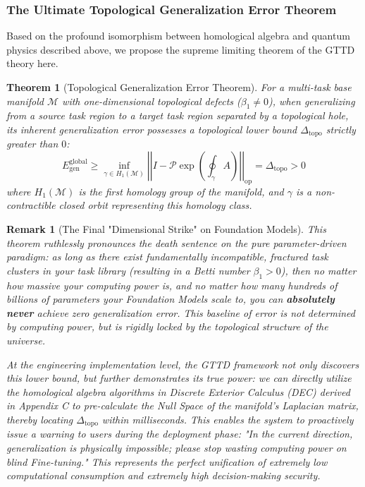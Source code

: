 \documentclass{article}
\newtheorem{theorem}{Theorem}[section]
\newtheorem{remark}{Remark}[section]
\begin{document}
\subsubsection{The Ultimate Topological Generalization Error Theorem}

Based on the profound isomorphism between homological algebra and quantum physics described above, we propose the supreme limiting theorem of the GTTD theory here.

\begin{theorem}[Topological Generalization Error Theorem]
For a multi-task base manifold $\mathcal{M}$ with one-dimensional topological defects ($\beta_1 \neq 0$), when generalizing from a source task region to a target task region separated by a topological hole, its inherent generalization error possesses a topological lower bound $\Delta_{\text{topo}}$ strictly greater than $0$:
\begin{equation}
E_{\text{gen}}^{\text{global}} \geq \inf_{\gamma \in H_1(\mathcal{M})} \left|\left| I - \mathcal{P}\exp \left( \oint_\gamma A \right) \right|\right|_{\text{op}} = \Delta_{\text{topo}} > 0
\end{equation}
where $H_1(\mathcal{M})$ is the first homology group of the manifold, and $\gamma$ is a non-contractible closed orbit representing this homology class.
\end{theorem}

\begin{remark}[The Final "Dimensional Strike" on Foundation Models]
This theorem ruthlessly pronounces the death sentence on the pure parameter-driven paradigm: as long as there exist fundamentally incompatible, fractured task clusters in your task library (resulting in a Betti number $\beta_1 > 0$), then no matter how massive your computing power is, and no matter how many hundreds of billions of parameters your Foundation Models scale to, you can \textbf{absolutely never} achieve zero generalization error. This baseline of error is not determined by computing power, but is rigidly locked by the topological structure of the universe.

At the engineering implementation level, the GTTD framework not only discovers this lower bound, but further demonstrates its true power: we can directly utilize the homological algebra algorithms in Discrete Exterior Calculus (DEC) derived in Appendix C to pre-calculate the Null Space of the manifold's Laplacian matrix, thereby locating $\Delta_{\text{topo}}$ within milliseconds. This enables the system to proactively issue a warning to users during the deployment phase: "In the current direction, generalization is physically impossible; please stop wasting computing power on blind Fine-tuning." This represents the perfect unification of extremely low computational consumption and extremely high decision-making security.
\end{remark}
\end{document}
